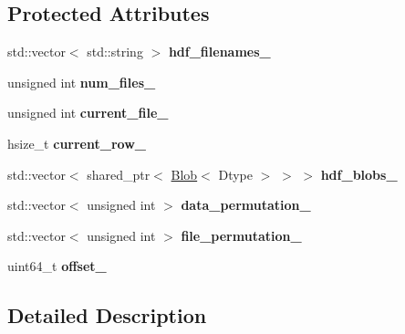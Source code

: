 \subsection*{Protected Attributes}
\begin{DoxyCompactItemize}
\item 
\mbox{\label{classcaffe_1_1_h_d_f5_data_layer_a628bff8f9a358c4382f2b835d3780748}} 
std\+::vector$<$ std\+::string $>$ {\bfseries hdf\+\_\+filenames\+\_\+}
\item 
\mbox{\label{classcaffe_1_1_h_d_f5_data_layer_aa6154c78cd3f375f1bba8dc544362e59}} 
unsigned int {\bfseries num\+\_\+files\+\_\+}
\item 
\mbox{\label{classcaffe_1_1_h_d_f5_data_layer_aa13b2e2012927eb433d007eb0cfcf8a7}} 
unsigned int {\bfseries current\+\_\+file\+\_\+}
\item 
\mbox{\label{classcaffe_1_1_h_d_f5_data_layer_a375f447a432bcd2ba94859b5b270ac96}} 
hsize\+\_\+t {\bfseries current\+\_\+row\+\_\+}
\item 
\mbox{\label{classcaffe_1_1_h_d_f5_data_layer_a82ad2d8eb3f36ddbb7296c3f3bbbc913}} 
std\+::vector$<$ shared\+\_\+ptr$<$ \mbox{\hyperlink{classcaffe_1_1_blob}{Blob}}$<$ Dtype $>$ $>$ $>$ {\bfseries hdf\+\_\+blobs\+\_\+}
\item 
\mbox{\label{classcaffe_1_1_h_d_f5_data_layer_afd2dd5a344053c1167229c908a78c79f}} 
std\+::vector$<$ unsigned int $>$ {\bfseries data\+\_\+permutation\+\_\+}
\item 
\mbox{\label{classcaffe_1_1_h_d_f5_data_layer_a0f2d824412b050620566bf81af110972}} 
std\+::vector$<$ unsigned int $>$ {\bfseries file\+\_\+permutation\+\_\+}
\item 
\mbox{\label{classcaffe_1_1_h_d_f5_data_layer_aa760969e3d444656b8dd4de2a2af1abe}} 
uint64\+\_\+t {\bfseries offset\+\_\+}
\end{DoxyCompactItemize}


\subsection{Detailed Description}

